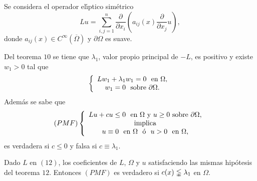 




Se considera el operador el\'{\i}ptico sim\'{e}trico
\begin{equation}
Lu=\sum_{i,j=1}^{n}\frac{\partial}{\partial x_{i}}\left(  a_{ij}\left(
x\right)  \frac{\partial}{\partial x_{j}}u\right)  ,\tag{12}%
\end{equation}
donde $a_{ij}\left(  x\right)  \in C^{\infty}\left(  \overline{\Omega}\right)
$ y $\partial\Omega$ es suave.

Del teorema $10$ se tiene que $\lambda_{1}$, valor propio principal de $-L$,
es positivo y existe $w_{1}>0$ tal que
\[
\left\{
\begin{array}
[c]{c}%
Lw_{1}+\lambda_{1}w_{1}=0\text{ \ en }\Omega,\\
w_{1}=0\text{ \ sobre }\partial\Omega.
\end{array}
\right.
\]
Adem\'{a}s se sabe que
\[
\left(  PMF\right)  \left\{
\begin{array}
[c]{c}%
Lu+cu\leq0\text{ \ en }\Omega\text{ y }u\geq0\text{ sobre }\partial\Omega,\\
\text{implica}\\
u\equiv0\text{ \ en }\Omega\text{ \ \'{o} \ }u>0\text{ \ en }\Omega\text{,}%
\end{array}
\right.
\]
es verdadera si $c\leq0$ y falsa si $c\equiv\lambda_{1}.$

\begin{theorem}
Dado $L$ en $\left(  12\right)  $, los coeficientes de $L$, $\Omega$ y $u$
satisfaciendo las mismas hip\'{o}tesis del teorema $12.$ Entonces $\left(
PMF\right)  $ es verdadero si $c(x)\lvertneqq\lambda_{1}$ en $\Omega.$
\end{theorem}

